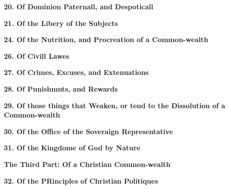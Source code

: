 \documentclass[11pt]{article}
\newcommand{\sectiontitle}[1]{{\Large {\bfseries #1}}}
\newcommand{\chapter}[1]{{\bfseries #1}}
\begin{document}
\chapter{20. Of Dominion Paternall, and Despoticall}

\chapter{21. Of the Libery of the Subjects}

\chapter{24. Of the Nutrition, and Procreation of a Common-wealth}

\chapter{26. Of Civill Lawes}

\chapter{27. Of Crimes, Excuses, and Extenuations}

\chapter{28. Of Punishmnts, and Rewards}

\chapter{29. Of those things that Weaken, or tend to the Dissolution of a 
Common-wealth}

\chapter{30. Of the Office of the Soveraign Representative}

\chapter{31. Of the Kingdome of God by Nature}

\sectiontitle{The Third Part: Of a Christian Common-wealth} 

\chapter{32. Of the PRinciples of Christian Politiques}
\end{document}
